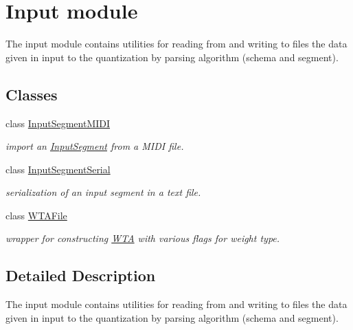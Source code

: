 \hypertarget{group__input}{}\section{Input module}
\label{group__input}


The {\ttfamily input} module contains utilities for reading from and writing to files the data given in input to the quantization by parsing algorithm (schema and segment).  


\subsection*{Classes}
\begin{DoxyCompactItemize}
\item 
class \mbox{\hyperlink{classInputSegmentMIDI}{Input\+Segment\+M\+I\+DI}}
\begin{DoxyCompactList}\small\item\em import an \mbox{\hyperlink{classInputSegment}{Input\+Segment}} from a M\+I\+DI file. \end{DoxyCompactList}\item 
class \mbox{\hyperlink{classInputSegmentSerial}{Input\+Segment\+Serial}}
\begin{DoxyCompactList}\small\item\em serialization of an input segment in a text file. \end{DoxyCompactList}\item 
class \mbox{\hyperlink{classWTAFile}{W\+T\+A\+File}}
\begin{DoxyCompactList}\small\item\em wrapper for constructing \mbox{\hyperlink{classWTA}{W\+TA}} with various flags for weight type. \end{DoxyCompactList}\end{DoxyCompactItemize}


\subsection{Detailed Description}
The {\ttfamily input} module contains utilities for reading from and writing to files the data given in input to the quantization by parsing algorithm (schema and segment). 

